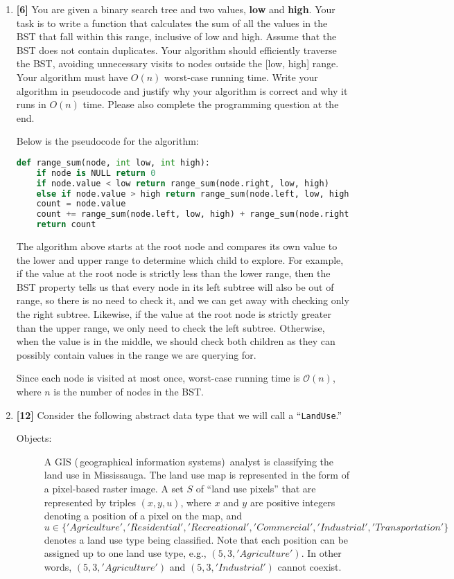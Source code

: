 \documentclass{assignment-263}
\begin{document}
\think
\begin{enumerate}
\item \textbf{[6]}
    You are given a binary search tree and two values, \textbf{low} and \textbf{high}. Your task 
    is to write a function that calculates the sum of all the values in the BST that fall within this
    range, inclusive of low and high. Assume that the BST does not contain duplicates. Your 
    algorithm should efficiently traverse the BST, avoiding unnecessary visits to nodes outside
    the [low, high] range. 
    Your algorithm must have $O(n)$ worst-case running time.
    Write your algorithm in pseudocode and justify why your algorithm is correct and why it runs 
    in $O(n)$ time. Please also complete the programming question at the end.

	Below is the pseudocode for the algorithm:
	\begin{lstlisting}[language=Python]
def range_sum(node, int low, int high):
	if node is NULL return 0
	if node.value < low return range_sum(node.right, low, high)
	else if node.value > high return range_sum(node.left, low, high)
	count = node.value
	count += range_sum(node.left, low, high) + range_sum(node.right, low, high)
	return count
	\end{lstlisting}
	The algorithm above starts at the root node and compares its own value to the lower and upper range to determine which child to explore. For example, if the value at the root node is strictly less than the lower range, then the BST property tells us that every node in its left subtree will also be out of range, so there is no need to check it, and we can get away with checking only the right subtree. Likewise, if the value at the root node is strictly greater than the upper range, we only need to check the left subtree. Otherwise, when the value is in the middle,  we should check both children as they can possibly contain values in the range we are querying for.

	Since each node is visited at most once, worst-case running time is \(\mathcal{O} (n)\), where \(n\) is the number of nodes in the BST.

\item \textbf{[12]}
    Consider the following abstract data type that we will call a
		``\texttt{LandUse}.''
		\begin{description}
		\item[Objects:]
				A GIS (\,geographical information systems)\, analyst is 
				classifying the land use in Mississauga.
				The land use map is represented in the form of a  
				pixel-based raster image. 
				A set $S$ of ``land use pixels'' that are represented by
				triples $(x, y, u)$, where $x$ and $y$ are positive
				integers denoting a position of a pixel on the map, and
				$u\in\{'Agriculture', 'Residential', 'Recreational',
				'Commercial', 'Industrial', 'Transportation'\}$ denotes 
				a land use type being classified. Note that each position
				can be assigned up to one land use type, e.g., 
				$(5, 3, 'Agriculture')$. In other words, $(5, 3, 'Agriculture')$ 
				and $(5, 3, 'Industrial')$ cannot coexist. 


\end{description}
\end{enumerate}
\end{document}
